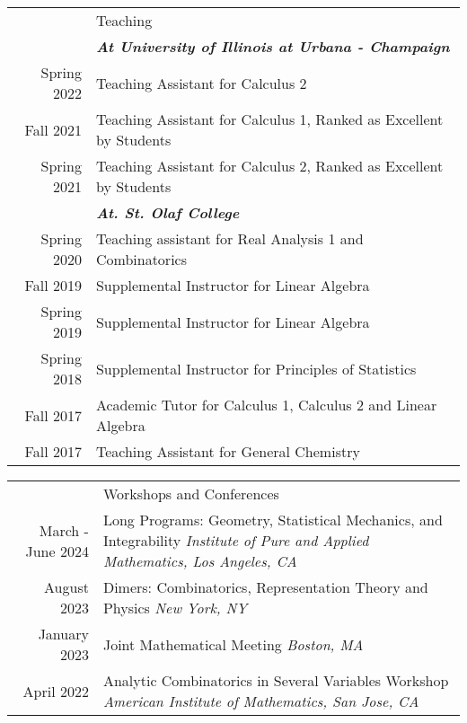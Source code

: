 \documentclass[letterpaper, 11pt]{article}
\newcommand{\headingfont}{\Large\color{Red}}
\newenvironment{SectionTable}[1]{
	\renewcommand*{\arraystretch}{1.7}
	\setlength{\tabcolsep}{10pt}
	\begin{longtable}{Rp{5.2in}} & #1 \\}
	{\end{longtable}\vspace{-.3cm}}
\begin{document}
	\begin{SectionTable}{\headingfont Teaching}
		& \textit{\textbf{At University of Illinois at Urbana - Champaign}}\\
		Spring 2022 & 
		Teaching Assistant for Calculus 2\\
		
		Fall 2021 & 
		Teaching Assistant for Calculus 1, Ranked as Excellent by Students\\
	
		Spring 2021 & 
		Teaching Assistant for Calculus 2, Ranked as Excellent by Students\\
		
		& \textit{\textbf{At. St. Olaf College}} \\
		Spring 2020 & 
		Teaching assistant for Real Analysis 1 and Combinatorics \\
		Fall 2019 & 
		Supplemental Instructor for Linear Algebra\\
		Spring 2019 & 
		Supplemental Instructor for Linear Algebra\\
		Spring 2018 & 
		Supplemental Instructor for Principles of Statistics\\
		Fall 2017 & 
		Academic Tutor for Calculus 1, Calculus 2 and Linear Algebra\\
		Fall 2017 & 
		Teaching Assistant for General Chemistry  \\
	
		

	\end{SectionTable}

	\begin{SectionTable}{\headingfont Workshops and Conferences}
		March - June 2024 &
		Long Programs: Geometry, Statistical Mechanics, and Integrability \newline
		\textit{Institute of Pure and Applied Mathematics, Los Angeles, CA} \\
		August 2023 &
		Dimers: Combinatorics, Representation Theory and Physics \newline
		\textit{New York, NY} \\
		January 2023 &
		Joint Mathematical Meeting \newline
		\textit{Boston, MA} \\
		April 2022 &
		Analytic Combinatorics in Several Variables Workshop \newline
		\textit{American Institute of Mathematics, San Jose, CA} \\
		
	\end{SectionTable}
\end{document}
